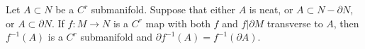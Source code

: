 Let $A \subset N$ be a $C^r$ submanifold. Suppose that either $A$ is neat, or $A \subset N - \partial N$, or $A \subset \partial N$. If $f: M \to N$ is a $C^r$ map with both $f$ and $f|\partial M$ transverse to $A$, then $f^{-1}(A)$ is a $C^r$ submanifold and $\partial f^{-1}(A) = f^{-1}(\partial A)$.
